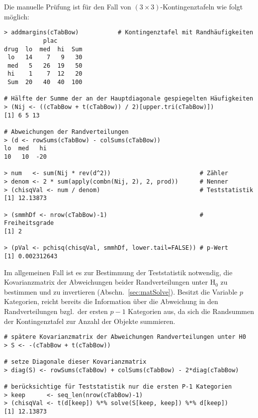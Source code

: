 Die manuelle Prüfung ist für den Fall von $(3 \times 3)$-Kontingenztafeln wie folgt möglich:
\begin{lstlisting}
> addmargins(cTabBow)           # Kontingenztafel mit Randhäufigkeiten
           plac
drug  lo  med  hi  Sum
 lo   14    7   9   30
 med   5   26  19   50
 hi    1    7  12   20
 Sum  20   40  40  100

# Hälfte der Summe der an der Hauptdiagonale gespiegelten Häufigkeiten
> (Nij <- ((cTabBow + t(cTabBow)) / 2)[upper.tri(cTabBow)])
[1] 6 5 13

# Abweichungen der Randverteilungen
> (d <- rowSums(cTabBow) - colSums(cTabBow))
lo  med   hi
10   10  -20

> num   <- sum(Nij * rev(d^2))                         # Zähler
> denom <- 2 * sum(apply(combn(Nij, 2), 2, prod))      # Nenner
> (chisqVal <- num / denom)                            # Teststatistik
[1] 12.13873

> (smmhDf <- nrow(cTabBow)-1)                          # Freiheitsgrade
[1] 2

> (pVal <- pchisq(chisqVal, smmhDf, lower.tail=FALSE)) # p-Wert
[1] 0.002312643
\end{lstlisting}

Im allgemeinen Fall ist es zur Bestimmung der Teststatistik notwendig, die Kovarianzmatrix der Abweichungen beider Randverteilungen unter $\text{H}_{0}$ zu bestimmen und zu invertieren (Abschn.\ \ref{sec:matSolve}). Besitzt die Variable $p$ Kategorien, reicht bereits die Information über die Abweichung in den Randverteilungen bzgl.\ der ersten $p-1$ Kategorien aus, da sich die Randsummen der Kontingenztafel zur Anzahl der Objekte summieren.
\begin{lstlisting}
# spätere Kovarianzmatrix der Abweichungen Randverteilungen unter H0
> S <- -(cTabBow + t(cTabBow))

# setze Diagonale dieser Kovarianzmatrix
> diag(S) <- rowSums(cTabBow) + colSums(cTabBow) - 2*diag(cTabBow)

# berücksichtige für Teststatistik nur die ersten P-1 Kategorien
> keep      <- seq_len(nrow(cTabBow)-1)
> (chisqVal <- t(d[keep]) %*% solve(S[keep, keep]) %*% d[keep])
[1] 12.13873
\end{lstlisting}
